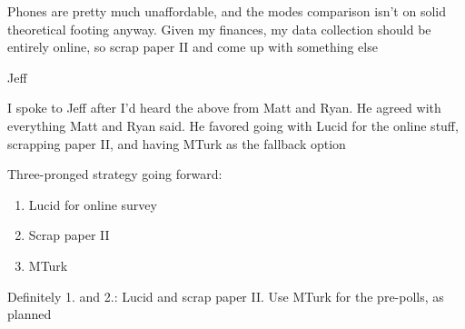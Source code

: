 \begin{coi}
\begin{coi}
					\begin{coi}
						\item Phones are pretty much unaffordable, and the modes comparison isn't on solid theoretical footing anyway. Given my finances, my data collection should be entirely online, so scrap paper II and come up with something else
					\end{coi}
				\item Jeff
					\begin{coi}
						\item I spoke to Jeff after I'd heard the above from Matt and Ryan. He agreed with everything Matt and Ryan said. He favored going with Lucid for the online stuff, scrapping paper II, and having MTurk as the fallback option
					\end{coi}
			\end{coi}
		\item Three-pronged strategy going forward:
			\begin{enumerate}
				\item Lucid for online survey
				\item Scrap paper II
				\item MTurk
			\end{enumerate}
		\item Definitely 1. and 2.: Lucid and scrap paper II. Use MTurk for the pre-polls, as planned
	\end{coi}



